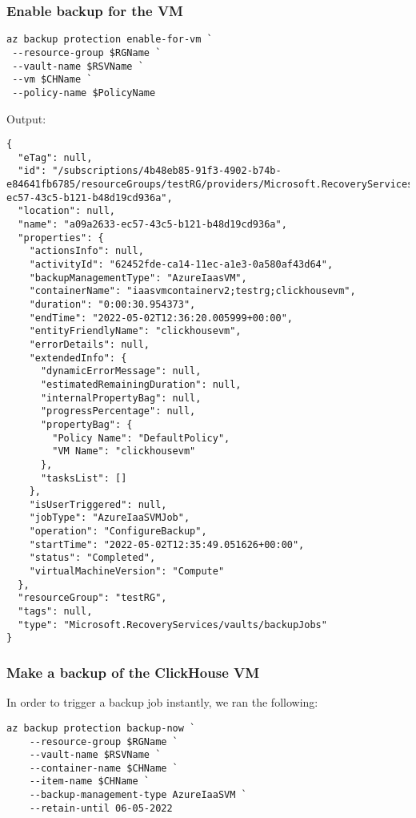 \subsubsection{Enable backup for the VM}
\label{sec:org3803369}
\begin{verbatim}
az backup protection enable-for-vm `
 --resource-group $RGName `
 --vault-name $RSVName `
 --vm $CHName `
 --policy-name $PolicyName
\end{verbatim}

Output:
\begin{verbatim}
{
  "eTag": null,
  "id": "/subscriptions/4b48eb85-91f3-4902-b74b-e84641fb6785/resourceGroups/testRG/providers/Microsoft.RecoveryServices/vaults/myRSV/backupJobs/a09a2633-ec57-43c5-b121-b48d19cd936a",
  "location": null,
  "name": "a09a2633-ec57-43c5-b121-b48d19cd936a",
  "properties": {
    "actionsInfo": null,
    "activityId": "62452fde-ca14-11ec-a1e3-0a580af43d64",
    "backupManagementType": "AzureIaasVM",
    "containerName": "iaasvmcontainerv2;testrg;clickhousevm",
    "duration": "0:00:30.954373",
    "endTime": "2022-05-02T12:36:20.005999+00:00",
    "entityFriendlyName": "clickhousevm",
    "errorDetails": null,
    "extendedInfo": {
      "dynamicErrorMessage": null,
      "estimatedRemainingDuration": null,
      "internalPropertyBag": null,
      "progressPercentage": null,
      "propertyBag": {
        "Policy Name": "DefaultPolicy",
        "VM Name": "clickhousevm"
      },
      "tasksList": []
    },
    "isUserTriggered": null,
    "jobType": "AzureIaaSVMJob",
    "operation": "ConfigureBackup",
    "startTime": "2022-05-02T12:35:49.051626+00:00",
    "status": "Completed",
    "virtualMachineVersion": "Compute"
  },
  "resourceGroup": "testRG",
  "tags": null,
  "type": "Microsoft.RecoveryServices/vaults/backupJobs"
}
\end{verbatim}

\subsubsection{Make a backup of the ClickHouse VM}
\label{sec:org9e0d508}
In order to trigger a backup job instantly, we ran the following:
\begin{verbatim}
az backup protection backup-now `
    --resource-group $RGName `
    --vault-name $RSVName `
    --container-name $CHName `
    --item-name $CHName `
    --backup-management-type AzureIaaSVM `
    --retain-until 06-05-2022
\end{verbatim}

